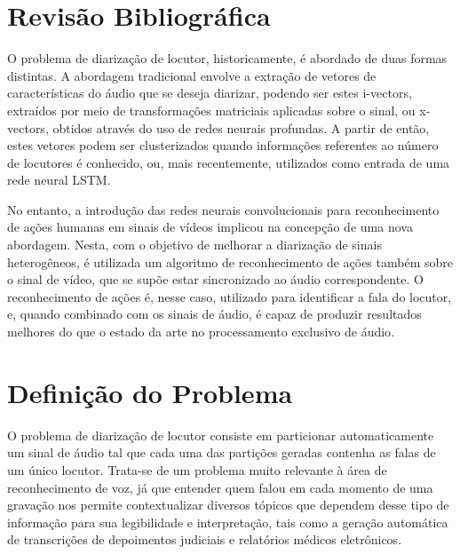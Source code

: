 \section{Revisão Bibliográfica}
\label{sec:related-work}

O problema de diarização de locutor, historicamente, é abordado de duas formas distintas.
A abordagem tradicional envolve a extração de vetores de características do áudio que se deseja diarizar, podendo ser estes i-vectors\cite{dehakFrontEndFactorAnalysis2011}, extraídos por meio de transformações matriciais aplicadas sobre o sinal, ou x-vectors\cite{snyderXVectorsRobustDNN2018}, obtidos através do uso de redes neurais profundas.
A partir de então, estes vetores podem ser clusterizados\cite{sellSpeakerDiarizationPlda2014} quando informações referentes ao número de locutores é conhecido, ou, mais recentemente, utilizados como entrada de uma rede neural LSTM\cite{wangSpeakerDiarizationLSTM2018}.

No entanto, a introdução das redes neurais convolucionais para reconhecimento de ações humanas em sinais de vídeos\cite{ji3DConvolutionalNeural2013, karpathyLargeScaleVideoClassification2014} implicou na concepção de uma nova abordagem.
Nesta, com o objetivo de melhorar a diarização de sinais heterogêneos, é utilizada um algoritmo de reconhecimento de ações também sobre o sinal de vídeo\cite{hersheyAudiovisualGraphicalModels2004}, que se supõe estar sincronizado ao áudio correspondente.
O reconhecimento de ações é, nesse caso, utilizado para identificar a fala do locutor, e, quando combinado com os sinais de áudio, é capaz de produzir resultados melhores do que o estado da arte no processamento exclusivo de áudio\cite{ephratLookingListenCocktail2018}.

\section{Definição do Problema}
\label{sec:problem-desc}

O problema de diarização de locutor consiste em particionar automaticamente um sinal de áudio tal que cada uma das partições geradas contenha as falas de um único locutor.
Trata-se de um problema muito relevante à área de reconhecimento de voz, já que entender quem falou em cada momento de uma gravação nos permite contextualizar diversos tópicos que dependem desse tipo de informação para sua legibilidade e interpretação, tais como a geração automática de transcrições de depoimentos judiciais e relatórios médicos eletrônicos.

